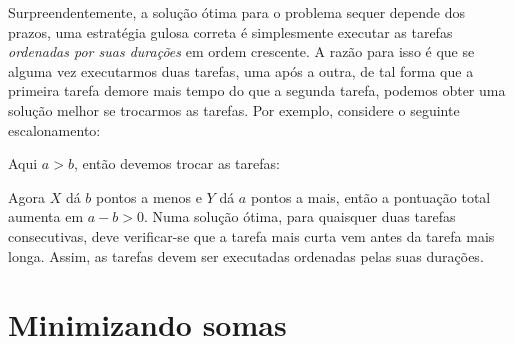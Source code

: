 Surpreendentemente, a solução ótima para o problema
sequer depende dos prazos, uma estratégia gulosa 
correta é simplesmente
executar as tarefas \emph{ordenadas por suas durações}
em ordem crescente.
A razão para isso é que se alguma vez executarmos
duas tarefas, uma após a outra, de tal forma que a primeira tarefa
demore mais tempo do que a segunda tarefa,
podemos obter uma solução melhor se trocarmos as tarefas.
Por exemplo, considere o seguinte escalonamento:
\begin{center}
\end{center}
Aqui $a>b$, então devemos trocar as tarefas:
\begin{center}
\end{center}
Agora $X$ dá $b$ pontos a menos e $Y$ dá $a$ pontos a mais,
então a pontuação total aumenta em $a-b > 0$.
Numa solução ótima,
para quaisquer duas tarefas consecutivas,
deve verificar-se que a tarefa mais curta vem
antes da tarefa mais longa.
Assim, as tarefas devem ser executadas
ordenadas pelas suas durações.

\section{Minimizando somas}

